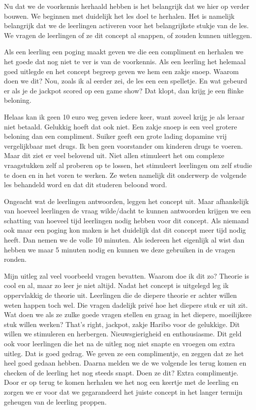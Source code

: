 \documentclass{article}
\begin{document}
                    Nu dat we de voorkennis herhaald hebben is het belangrijk dat we hier op verder bouwen. We beginnen met duidelijk het les doel te herhalen. Het is namelijk belangrijk dat we de leerlingen activeren voor het belangrijkste stukje van de les. We vragen de leerlingen of ze dit concept al snappen, of zouden kunnen uitleggen. 

                    Als een leerling een poging maakt geven we die een compliment en herhalen we het goede dat nog niet te ver is van de voorkennis. Als een leerling het helemaal goed uitlegde en het concept begreep geven we hem een zakje snoep. Waarom doen we dit? Nou, zoals ik al eerder zei, de les een een spelletje. En wat gebeurd er als je de jackpot scored op een game show? Dat klopt, dan krijg je een flinke beloning. 

                    Helaas kan ik geen 10 euro weg geven iedere keer, want zoveel krijg je als leraar niet betaald. Gelukkig hoeft dat ook niet. Een zakje snoep is een veel grotere beloning dan een compliment. Suiker geeft een grote lading dopamine vrij vergelijkbaar met drugs.\cite{sugar-equals-drugs} Ik ben geen voorstander om kinderen drugs te voeren. Maar dit ziet er veel belovend uit. Niet allen stimuleert het om complexe vraagstukken zelf al proberen op te lossen, het stimuleert leerlingen om zelf studie te doen en in het voren te werken. Ze weten namelijk dit onderwerp de volgende les behandeld word en dat dit studeren beloond word. 

                    Ongeacht wat de leerlingen antwoorden, leggen het concept uit. Maar afhankelijk van hoeveel leerlingen de vraag wilde/dacht te kunnen antwoorden krijgen we een schatting van hoeveel tijd leerlingen nodig hebben voor dit concept. Als niemand ook maar een poging kon maken is het duidelijk dat dit concept meer tijd nodig heeft. Dan nemen we de volle 10 minuten. Als iedereen het eigenlijk al wist dan hebben we maar 5 minuten nodig en kunnen we deze gebruiken in de vragen ronden. 

                    Mijn uitleg zal veel voorbeeld vragen bevatten. Waarom doe ik dit zo? Theorie is cool en al, maar zo leer je niet altijd. Nadat het concept is uitgelegd leg ik oppervlakkig de theorie uit. Leerlingen die de diepere theorie er achter willen weten happen toch wel. Die vragen dadelijk privé hoe het diepere stuk er uit zit. Wat doen we als ze zulke goede vragen stellen en graag in het diepere, moeilijkere stuk willen werken? That's right, jackpot, zakje Haribo voor de gelukkige. Dit willen we stimuleren en herbergen. Nieuwsgierigheid en enthousiasme. Dit geld ook voor leerlingen die het na de uitleg nog niet snapte en vroegen om extra uitleg. Dat is goed gedrag. We geven ze een complimentje, en zeggen dat ze het heel goed gedaan hebben. Daarna melden we de we volgende les terug komen en checken of de leerling het nog steeds snapt. Doen ze dit? Extra complimentje. Door er op terug te komen herhalen we het nog een keertje met de leerling en zorgen we er voor dat we gegarandeerd het juiste concept in het langer termijn geheugen van de leerling proppen.
                
\end{document}
